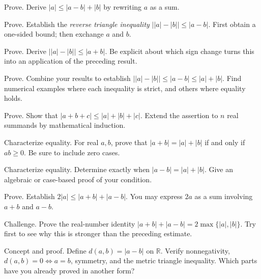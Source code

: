 \documentclass{workbook}
\begin{document}
\begin{problem}{Prove.}
Derive $|a|\leq|a-b|+|b|$ by rewriting $a$ as a sum.
\end{problem}

\begin{problem}{Prove.}
Establish the \emph{reverse triangle inequality}
$\bigl||a|-|b|\bigr|\leq|a-b|$.
First obtain a one-sided bound; then exchange $a$ and $b$.
\end{problem}

\begin{problem}{Prove.}
Derive $\bigl||a|-|b|\bigr|\leq|a+b|$.
Be explicit about which sign change turns this into an application of
the preceding result.
\end{problem}

\begin{problem}{Prove.}
Combine your results to establish
$\bigl||a|-|b|\bigr|\leq|a-b|\leq|a|+|b|$.
Find numerical examples where each inequality is strict, and others
where equality holds.
\end{problem}

\begin{problem}{Prove.}
Show that $|a+b+c|\leq|a|+|b|+|c|$.
Extend the assertion to $n$ real summands by mathematical induction.
\end{problem}

\begin{problem}{Characterize equality.}
For real $a,b$, prove that $|a+b|=|a|+|b|$ if and only if $ab\geq0$.
Be sure to include zero cases.
\end{problem}

\begin{problem}{Characterize equality.}
Determine exactly when $|a-b|=|a|+|b|$.
Give an algebraic or case-based proof of your condition.
\end{problem}

\begin{problem}{Prove.}
Establish $2|a|\leq|a+b|+|a-b|$.
You may express $2a$ as a sum involving $a+b$ and $a-b$.
\end{problem}

\begin{problem}{Challenge.}
Prove the real-number identity
$|a+b|+|a-b|=2\max\{|a|,|b|\}$.
Try first to see why this is stronger than the preceding estimate.
\end{problem}

\begin{problem}{Concept and proof.}
Define $d(a,b)=|a-b|$ on $\mathbb R$. Verify nonnegativity,
$d(a,b)=0\iff a=b$, symmetry, and the metric triangle inequality.
Which parts have you already proved in another form?
\end{problem}
\end{document}
